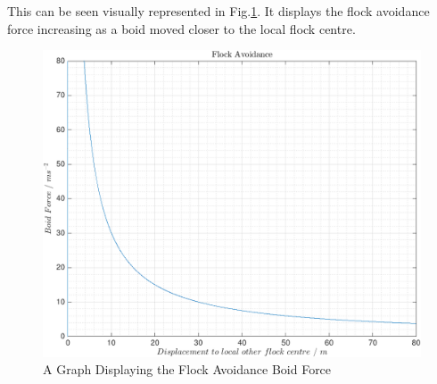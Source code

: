 This can be seen visually represented in Fig.\ref{fig:flockavoidance}. It displays the flock avoidance force increasing as a boid moved closer to the local flock centre.
\begin{figure}[H]
	\includegraphics[width=\linewidth]{../Images/flockavoidance.png}
	\caption{A Graph Displaying the Flock Avoidance Boid Force}
	\label{fig:flockavoidance}
\end{figure}











